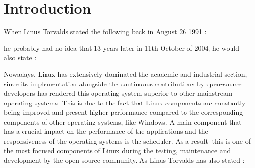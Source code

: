 \documentclass[diploma]{Styles/softlab-thesis}
\begin{document}
\mainmatter


\chapter{Introduction}

When Linus Torvalds stated the following back in August 26 1991 :
\begin{quote}
\end{quote}
he probably had no idea that 13 years later in 11th October of 2004, he would also state :
\begin{quote}
\end{quote}
Nowadays, Linux has extensively dominated the academic and industrial section, since its implementation alongside the continuous contributions by open-source developers has rendered this operating system superior to other mainstream operating systems. This is due to the fact that Linux components are constantly being improved and present higher performance compared to the corresponding components of other operating systems, like Windows. A main component that has a crucial impact on the performance of the applications and the responsiveness of the operating systems is the scheduler. As a result, this is one of the most focused components of Linux during the testing, maintenance and development by the open-source community. As Linus Torvalds has also stated :
\begin{quote}
\end{quote}
\end{document}
